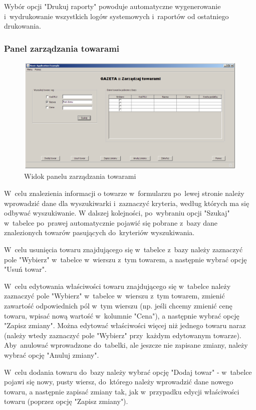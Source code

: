 Wybór opcji "Drukuj raporty" powoduje automatyczne wygenerowanie i~wydrukowanie wszystkich logów systemowych i~raportów od ostatniego drukowania.
\clearpage
\subsubsection{Panel zarządzania towarami}
\begin{figure}[h]
\begin{center}
\includegraphics[width=20cm,angle=90,keepaspectratio]{gfx/zarzadzaj_towarami.png}
\end{center}
\caption{Widok panelu zarządzania towarami}
\end{figure}
W~celu znalezienia informacji o towarze w~formularzu po~lewej stronie należy wprowadzić dane dla wyszukiwarki i~zaznaczyć kryteria, według których ma się odbywać wyszukiwanie. W dalszej kolejności, po~wybraniu opcji "Szukaj" w~tabelce po~prawej automatycznie pojawić się pobrane z~bazy dane znalezionych towarów pasujących do~kryteriów wyszukiwania.

W~celu usunięcia towaru znajdującego się w~tabelce z~bazy należy zaznaczyć pole "Wybierz" w~tabelce w~wierszu z~tym towarem, a następnie wybrać opcję "Usuń towar".

W~celu edytowania właściwości towaru znajdującego się w~tabelce należy zaznaczyć pole "Wybierz" w~tabelce w~wierszu z~tym towarem, zmienić zawartość odpowiednich pól w~tym wierszu (np. jeśli chcemy zmienić cenę towaru, wpisać nową wartość w~kolumnie "Cena"), a następnie wybrać opcję "Zapisz zmiany". Można edytować właściwości więcej niż jednego towaru naraz (należy wtedy zaznaczyć pole "Wybierz" przy~każdym edytowanym towarze). Aby~anulować wprowadzone do~tabelki, ale jeszcze nie zapisane zmiany, należy wybrać opcję "Anuluj zmiany".

W~celu dodania towaru do~bazy należy wybrać opcję "Dodaj towar" - w~tabelce pojawi się nowy, pusty wiersz, do~którego należy wprowadzić dane nowego towaru, a następnie zapisać zmiany tak, jak w~przypadku edycji właściwości towaru (poprzez opcję "Zapisz zmiany").

